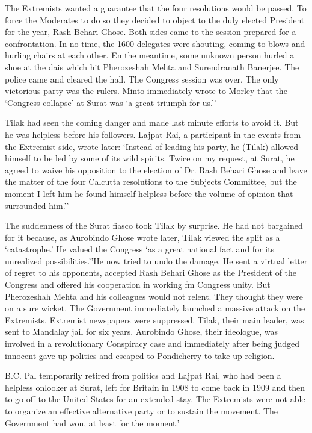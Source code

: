 The Extremists wanted a guarantee that the four resolutions would be passed. To force the Moderates to do so they decided to object to the duly elected President for the year, Rash Behari Ghose. Both sides came to the session prepared for a confrontation. In no time, the 1600 delegates were shouting, coming to blows and hurling chairs at each other. En the meantime, some unknown person hurled a shoe at the dais which hit Pherozeshah Mehta and Surendranath Banerjee. The police came and cleared the hall. The Congress session was over. The only victorious party was the rulers. Minto immediately wrote to Morley that the `Congress collapse' at Surat was `a great triumph for us.''

Tilak had seen the coming danger and made last minute efforts to avoid it. But he was helpless before his followers. Lajpat Rai, a participant in the events from the Extremist side, wrote later: `Instead of leading his party, he (Tilak) allowed himself to be led by some of its wild spirits. Twice on my request, at Surat, he agreed to waive his opposition to the election of Dr. Rash Behari Ghose and leave the matter of the four Calcutta resolutions to the Subjects Committee, but the moment I left him he found himself helpless before the volume of opinion that surrounded him.''

The suddenness of the Surat fiasco took Tilak by surprise. He had not bargained for it because, as Aurobindo Ghose wrote later, Tilak viewed the split as a `catastrophe.' He valued the Congress `as a great national fact and for its unrealized possibilities.''He now tried to undo the damage. He sent a virtual letter of regret to his opponents, accepted Rash Behari Ghose as the President of the Congress and offered his cooperation in working fm Congress unity. But Pherozeshah Mehta and his colleagues would not relent. They thought they were on a sure wicket. The Government immediately launched a massive attack on the Extremists. Extremist newspapers were suppressed. Tilak, their main leader, was sent to Mandalay jail for six years. Aurobindo Ghose, their ideologue, was involved in a revolutionary Conspiracy case and immediately after being judged innocent gave up politics and escaped to Pondicherry to take up religion.

B.C. Pal temporarily retired from politics and Lajpat Rai, who had been a helpless onlooker at Surat, left for Britain in 1908 to come back in 1909 and then to go off to the United States for an extended stay. The Extremists were not able to organize an effective alternative party or to sustain the movement. The Government had won, at least for the moment.'

